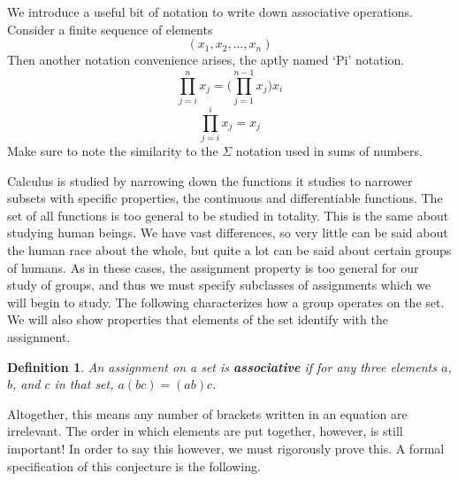 \documentclass[12pt]{report}
\newtheorem{definition}{Definition}
\begin{document}
We introduce a useful bit of notation to write down associative operations. Consider a finite sequence of elements
%
\[ (x_1,x_2, \dots, x_n) \]
%
Then another notation convenience arises, the aptly named `Pi' notation.
%
\[ \prod_{j = i}^n x_j = \big( \prod_{j = 1}^{n-1} x_j \big) x_i \]
\[ \prod_{j = i}^i x_j = x_j \]
%
Make sure to note the similarity to the $\Sigma$ notation used in sums of numbers.

Calculus is studied by narrowing down the functions it studies to narrower subsets with specific properties, the continuous and differentiable functions. The set of all functions is too general to be studied in totality. This is the same about studying human beings. We have vast differences, so very little can be said about the human race about the whole, but quite a lot can be said about certain groups of humans. As in these cases, the assignment property is too general for our study of groups, and thus we must specify subclasses of assignments which we will begin to study. The following characterizes how a group operates on the set. We will also show properties that elements of the set identify with the assignment.

\begin{definition}
    An assignment on a set is {\bf associative} if for any three elements $a$, $b$, and $c$ in that set, $a(bc) = (ab)c$.
\end{definition}

Altogether, this means any number of brackets written in an equation are irrelevant. The order in which elements are put together, however, is still important! In order to say this however, we must rigorously prove this. A formal specification of this conjecture is the following.
\end{document}
